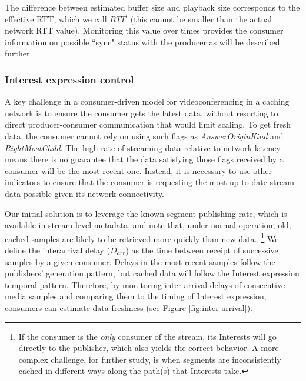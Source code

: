 \documentclass{icn/sig-alternate-2012} %
\begin{document}
The difference between estimated buffer size and playback size corresponds to the effective RTT, which we call $RTT^{\prime}$ (this cannot be smaller than the actual network RTT value). %
Monitoring this value over times provides the consumer information on possible ``sync" status with the producer as will be described further. %

\subsubsection{Interest expression control}



A key challenge in a consumer-driven model for videoconferencing in a caching network is to ensure the consumer gets the latest data, without resorting to direct producer-consumer communication that would limit scaling. To get fresh data, the consumer cannot rely on using such flags as \textit{AnswerOriginKind} and \textit{RightMostChild}. The high rate of streaming data relative to network latency means there is no guarantee that the data satisfying those flags received by a consumer will be the most recent one. Instead, it is necessary to use other indicators to ensure that the consumer is requesting the most up-to-date stream data possible given its network connectivity. 

Our initial solution is to leverage the known segment publishing rate, which is available in stream-level metadata, and note that, under normal operation, old, cached samples are likely to be retrieved more quickly than new data.~\footnote{If the consumer is the \emph{only} consumer of the stream, its Interests will go directly to the publisher, which also yields the correct behavior. A more complex challenge, for further study, is when segments are inconsistently cached in different ways along the path(s) that Interests take.} We define the interarrival delay ($D_{arr}$) as the time between receipt of successive samples by a given consumer. Delays in the most recent samples follow the publishers' generation pattern, but cached data will follow the Interest expression temporal pattern. Therefore, by monitoring inter-arrival delays of consecutive media samples and comparing them to the timing of Interest expression, consumers can estimate data freshness (see Figure \ref{fig:inter-arrival}).
\end{document}
